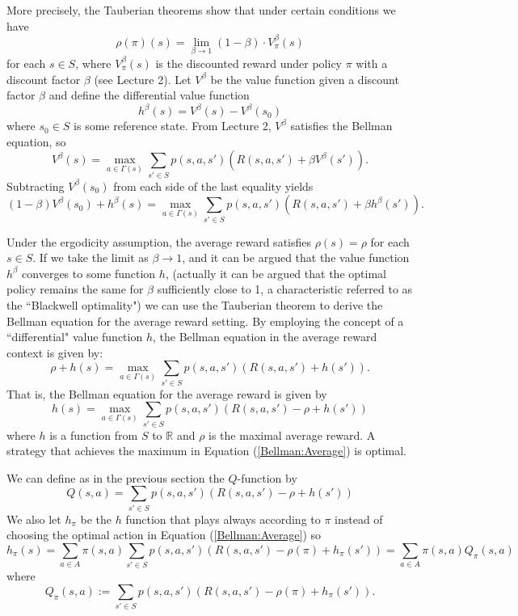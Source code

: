 \documentclass[letter,11pt]{article}
\begin{document}
More precisely, the Tauberian theorems show that under certain conditions we have
\[
\rho(\pi) (s) = \lim_{\beta \to 1} (1-\beta) \cdot V^\beta_\pi(s)
\]
for each $s \in S$, where $V^\beta_\pi(s)$ is the discounted reward under policy $\pi$ with a discount factor $\beta$ (see Lecture 2). Let $V^{\beta} $ be the value function given a discount factor $\beta$ and define the differential value function $$ h^{\beta} (s) = V^{\beta} (s) - V^{\beta} (s_0)$$ 
where \( s_0 \in S \) is some reference state. From Lecture 2, $V^{\beta}$ satisfies the Bellman equation, so 
$$ V^{\beta} (s)  = \max _{a \in \Gamma(s) }\sum _{s' \in S} p(s,a,s') \left (   R(s,a,s') + \beta  V^{\beta} (s') \right).  $$
Subtracting $V^{\beta} (s_{0})$ from each side of the last equality yields 
$$ (1-\beta) V^{\beta} (s_{0})  + h^{\beta} (s) = \max _{a \in \Gamma(s) }\sum _{s' \in S} p(s,a,s') \left (   R(s,a,s') + \beta  h^{\beta} (s') \right).$$

Under the ergodicity assumption, the average reward satisfies $\rho(s) = \rho$ for each $s \in S$. If we take the limit as \(\beta \to 1\), and it can be argued that the value function \(h^{\beta}\) converges to some function \(h\), (actually it can be argued that the optimal policy remains the same for \(\beta\) sufficiently close to 1, a characteristic referred to as the ``Blackwell optimality") we can use the Tauberian theorem to derive the Bellman equation for the average reward setting. By employing the concept of a ``differential" value function \(h\), the Bellman equation in the average reward context is given by: 
\[
\rho + h(s)  = \max _{a \in \Gamma(s) }\sum _{s' \in S} p(s,a,s') \left (   R(s,a,s') +  h (s') \right).
\]
That is, the Bellman equation for the average reward is given by
\begin{equation} \label{Bellman:Average}
 h(s) = \max _{a \in \Gamma(s) }\sum _{s' \in S} p(s,a,s') \left (   R(s,a,s') - \rho +  h (s') \right)  
\end{equation}
where $h$ is a function from $S$ to $\mathbb{R}$ and $\rho$ is the maximal average reward. A strategy that achieves the maximum in Equation (\ref{Bellman:Average}) is optimal. 



We can define as in the previous section the $Q$-function by 
\begin{equation} \label{Eq:Q-functionaverage}
    Q(s,a) = \sum _{s' \in S} p(s,a,s') \left (   R(s,a,s') - \rho +  h (s') \right)
\end{equation}
We also let $h_{\pi }$ be the $h$ function that plays always  according to $\pi$ instead of choosing the optimal action in Equation (\ref{Bellman:Average}) so 
$$ h_{\pi} (s)  = \sum _{a \in A} \pi(s,a) \sum _{s' \in S} p(s,a,s') \left (   R(s,a,s') - \rho(\pi) +  h_{\pi } (s') \right) = \sum _{a \in A} \pi(s,a)Q_{\pi}(s,a)  $$
where
$$Q_{\pi}(s,a) :=  \sum _{s' \in S} p(s,a,s') \left (   R(s,a,s') - \rho (\pi) +  h_{\pi } (s') \right). $$ 
\end{document}
